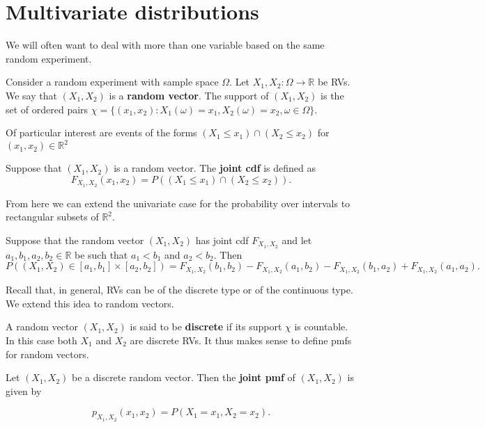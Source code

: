 \section{Multivariate distributions}

We will often want to deal with more than one variable based on the same random experiment.

\begin{definition}
	Consider a random experiment with sample space $\Omega$. Let $X_1,X_2:\Omega\to\mathbb R$ be RVs. We say that $(X_1,X_2)$ is a \textbf{random vector}. The support of $(X_1,X_2)$ is the set of ordered pairs $\chi=\{(x_1,x_2):X_1(\omega)=x_1,X_2(\omega)=x_2,\omega\in \Omega\}$.
\end{definition}

Of particular interest are events of the forms $(X_1\leq x_1)\cap(X_2\leq x_2)$ for $(x_1,x_2)\in\mathbb R^2$

\begin{definition}
	Suppose that $(X_1,X_2)$ is a random vector. The \textbf{joint cdf} is defined as $$F_{X_1,X_2}(x_1,x_2)=P((X_1\leq x_1)\cap(X_2\leq x_2)).$$
\end{definition}

From here we can extend the univariate case for the probability over intervals to rectangular subsets of $\mathbb R^2$.

\begin{theorem}[]
	Suppose that the random vector $(X_1,X_2)$ has joint cdf $F_{X_1,X_2}$ and let $a_1,b_1,a_2,b_2\in\mathbb R$ be such that $a_1<b_1$ and $a_2<b_2$. Then $$P((X_1,X_2)\in[a_1,b_1]\times[a_2,b_2])=F_{X_1,X_2}(b_1,b_2)-F_{X_1,X_2}(a_1,b_2)-F_{X_1,X_2}(b_1,a_2)+F_{X_1,X_2}(a_1,a_2).$$
\end{theorem}

Recall that, in general, RVs can be of the discrete type or of the continuous type. We extend this idea to random vectors.

A random vector $(X_1,X_2)$ is said to be \textbf{discrete} if its support $\chi$ is countable. In this case both $X_1$ and $X_2$ are discrete RVs. It thus makes sense to define pmfs for random vectors.

\begin{definition}
	Let $(X_1,X_2)$ be a discrete random vector. Then the \textbf{joint pmf} of $(X_1,X_2)$ is given by

	$$p_{X_1,X_2}(x_1,x_2)=P(X_1=x_1,X_2=x_2).$$
\end{definition}

